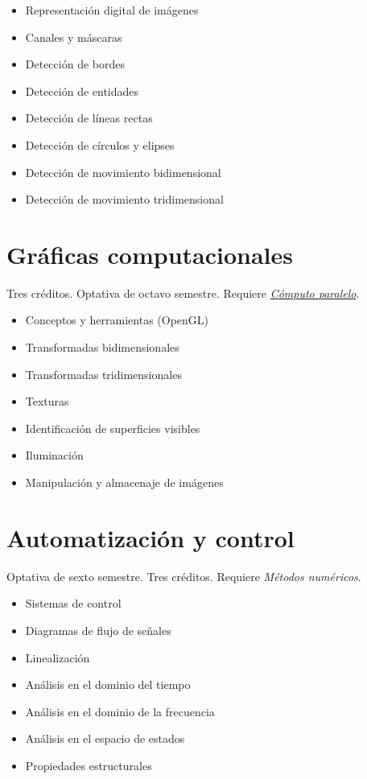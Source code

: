 \documentclass{article}
\begin{document}
\begin{multicols}{4}
\begin{itemize}
\item{Representaci\'{o}n digital de im\'{a}genes}
\item{Canales y m\'{a}scaras}
\item{Detecci\'{o}n de bordes}
\item{Detecci\'{o}n de entidades}
\item{Detecci\'{o}n de l\'{i}neas rectas}
\item{Detecci\'{o}n de c\'{i}rculos y elipses}
\item{Detecci\'{o}n de movimiento bidimensional}
\item{Detecci\'{o}n de movimiento tridimensional}
\end{itemize}

\vfill\null \columnbreak

\hypertarget{gc}{\section*{Gr\'{a}ficas computacionales}}

Tres cr\'{e}ditos. Optativa de octavo semestre.  Requiere
\hyperlink{cp}{\em C\'{o}mputo paralelo}.

\begin{itemize}
\item{Conceptos y herramientas (OpenGL)}  
\item{Transformadas bidimensionales}
\item{Transformadas tridimensionales}  
\item{Texturas}
\item{Identificaci\'{o}n de superficies visibles}  
\item{Iluminaci\'{o}n}
\item{Manipulaci\'{o}n y almacenaje de im\'{a}genes}
\end{itemize}

\newpage

\hypertarget{ayc}{\section*{Automatizaci\'{o}n y control}} 

Optativa de sexto semestre. Tres cr\'{e}ditos. Requiere {\em M\'{e}todos num\'{e}ricos}.

\begin{itemize}
\item{Sistemas de control}
\item{Diagramas de flujo de se\~{n}ales}
\item{Linealizaci\'{o}n}
\item{An\'{a}lisis en el dominio del tiempo}
\item{An\'{a}lisis en el dominio de la frecuencia}
\item{An\'{a}lisis en el espacio de estados}
\item{Propiedades estructurales}
\end{itemize}


\end{multicols}
\end{document}
